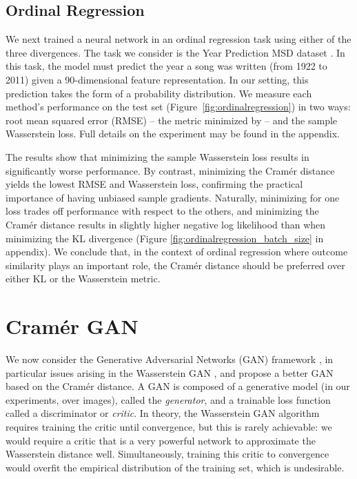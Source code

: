 \documentclass{article}
\begin{document}
\subsection*{Ordinal Regression}

We next trained a neural network in an ordinal regression task using either of the three divergences. The task we consider is the Year Prediction MSD dataset \citep{ucirepository}. In this task, the model must predict the year a song was written (from 1922 to 2011) given a 90-dimensional feature representation. In our setting, this prediction takes the form of a probability distribution. We measure each method's performance on the test set (Figure~\ref{fig:ordinalregression}) in two ways: root mean squared error (RMSE) -- the metric minimized by \citet{PB} -- and the sample Wasserstein loss. Full details on the experiment may be found in the appendix.

The results show that minimizing the sample Wasserstein loss results in significantly worse performance. By contrast, minimizing the Cram\'er distance yields the lowest RMSE and Wasserstein loss, confirming the practical importance of having unbiased sample gradients. 
Naturally, minimizing for one loss trades off performance with respect to the others, and minimizing the Cram\'er distance results in slightly higher negative log likelihood than when minimizing the KL divergence (Figure \ref{fig:ordinalregression_batch_size} in appendix). We conclude that, in the context of ordinal regression where outcome similarity plays an important role, the Cram\'er distance should be preferred over either KL or the Wasserstein metric.

\section{Cram\'er GAN}\label{sec:cramer_gan}

We now consider the Generative Adversarial Networks (GAN) framework \citep{goodfellow14generative}, in particular issues arising in the Wasserstein GAN \citep{arjovsky17wasserstein},
and propose a better GAN based on the Cram\'er distance. A GAN is composed of a generative model (in our experiments, over images), called the \emph{generator}, and a trainable loss function called a discriminator or \emph{critic}.
In theory, the Wasserstein GAN algorithm requires training the critic until convergence, but this is rarely achievable: we would require a critic that is a very powerful network to approximate the Wasserstein distance well. Simultaneously, training this critic to convergence  would overfit the empirical distribution of the training set, which is undesirable.
\end{document}
